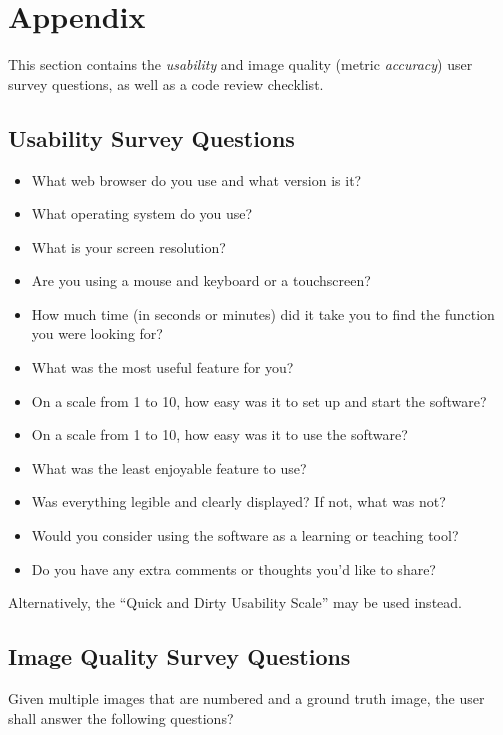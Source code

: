 \documentclass[12pt, titlepage]{article}
\begin{document}



\newpage

\section{Appendix} \label{sec_Appendix}

This section contains the \textit{usability} and image quality (metric \textit{accuracy}) 
user survey questions, as well as a code review checklist.

\subsection{Usability Survey Questions} \label{survey_usability}

\begin{itemize}
  \item{What web browser do you use and what version is it?}
  \item{What operating system do you use?}
  \item{What is your screen resolution?}
  \item{Are you using a mouse and keyboard or a touchscreen?}
  \item{How much time (in seconds or minutes) did it take you to find the function you were looking for?}
  \item{What was the most useful feature for you?}
  \item{On a scale from 1 to 10, how easy was it to set up and start the software?}
  \item{On a scale from 1 to 10, how easy was it to use the software?}
  \item{What was the least enjoyable feature to use?}
  \item{Was everything legible and clearly displayed? If not, what was not?}
  \item{Would you consider using the software as a learning or teaching tool?}
  \item{Do you have any extra comments or thoughts you'd like to share?}
\end{itemize}

\noindent Alternatively, the ``Quick and Dirty Usability Scale'' \cite{qnd_usability} may be used
instead.

\subsection{Image Quality Survey Questions} \label{survey_metric}
Given multiple images that are numbered and a ground truth image, 
the user shall answer the following questions?
\end{document}
